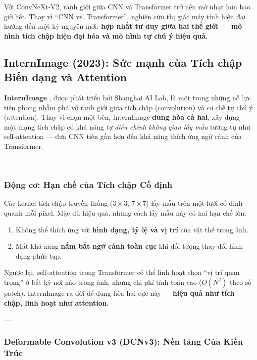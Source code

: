 Với ConvNeXt-V2, ranh giới giữa CNN và Transformer trở nên mờ nhạt hơn bao giờ hết. Thay vì “CNN vs. Transformer”, nghiên cứu thị giác máy tính hiện đại hướng đến một kỷ nguyên mới: \textbf{hợp nhất tư duy giữa hai thế giới — mô hình tích chập hiện đại hóa và mô hình tự chú ý hiệu quả.}

\subsection{InternImage (2023): Sức mạnh của Tích chập Biến dạng và Attention}
\label{subsec:internimage}

\textbf{InternImage} \cite{Wang2023}, được phát triển bởi Shanghai AI Lab, là một trong những nỗ lực tiên phong nhằm phá vỡ ranh giới giữa tích chập (convolution) và cơ chế tự chú ý (attention).  
Thay vì chọn một bên, InternImage \textbf{dung hòa cả hai}, xây dựng một mạng tích chập có khả năng \textit{tự điều chỉnh không gian lấy mẫu} tương tự như self-attention — đưa CNN tiến gần hơn đến khả năng thích ứng ngữ cảnh của Transformer.

---

\subsubsection{Động cơ: Hạn chế của Tích chập Cố định}
\label{subsubsec:internimage_motivation}

Các kernel tích chập truyền thống ($3 \times 3$, $7 \times 7$) lấy mẫu trên một lưới cố định quanh mỗi pixel.  
Mặc dù hiệu quả, nhưng cách lấy mẫu này có hai hạn chế lớn:
\begin{enumerate}
	\item Không thể thích ứng với \textbf{hình dạng, tỷ lệ và vị trí} của vật thể trong ảnh.
	\item Mất khả năng \textbf{nắm bắt ngữ cảnh toàn cục} khi đối tượng thay đổi hình dạng phức tạp.
\end{enumerate}

Ngược lại, self-attention trong Transformer có thể linh hoạt chọn “vị trí quan trọng” ở bất kỳ nơi nào trong ảnh, nhưng chi phí tính toán cao ($O(N^2)$ theo số patch).  
InternImage ra đời để dung hòa hai cực này — \textbf{hiệu quả như tích chập, linh hoạt như attention.}

---

\subsubsection{Deformable Convolution v3 (DCNv3): Nền tảng Của Kiến Trúc}
\label{subsubsec:dcnv3}

